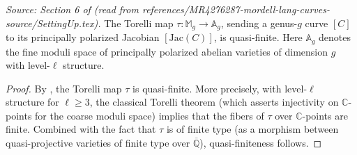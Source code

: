 \begin{lemma}
  \label{lem:torelli_quasi_finite}
  \textit{Source: Section 6 of \cite{MR4276287-mordell-lang-curves} (read from references/MR4276287-mordell-lang-curves-source/SettingUp.tex).}
  The Torelli map \(\tau \colon \mathbb{M}_g \to \mathbb{A}_g\), sending a genus-\(g\) curve
  \([C]\) to its principally polarized Jacobian \([\mathrm{Jac}(C)]\), is quasi-finite. Here
  \(\mathbb{A}_g\) denotes the fine moduli space of principally polarized abelian varieties of
  dimension \(g\) with level-\(\ell\) structure.
\end{lemma}

\begin{proof}
  By \cite[Lemma~1.11]{OortSteenbrink}, the Torelli map \(\tau\) is quasi-finite. More
  precisely, with level-\(\ell\) structure for \(\ell \ge 3\), the classical Torelli theorem
  (which asserts injectivity on \(\mathbb{C}\)-points for the coarse moduli space) implies
  that the fibers of \(\tau\) over \(\mathbb{C}\)-points are finite. Combined with the fact
  that \(\tau\) is of finite type (as a morphism between quasi-projective varieties of finite
  type over \(\overline{\mathbb{Q}}\)), quasi-finiteness follows.
\end{proof}
